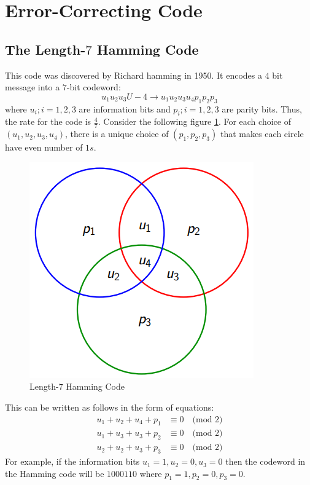 \documentclass[12pt, oneside]{book}
\theoremstyle{definition}
\theoremstyle{definition}
\theoremstyle{remark}
\begin{document}
\section{Error-Correcting Code}
\subsection{The Length-$7$ Hamming Code}
This code was discovered by Richard hamming in 1950. It encodes a $4$ bit message into a $7$-bit codeword:
\[
u_1u_2u_3U-4\rightarrow u_1u_2u_3u_4p_1p_2p_3
\]
where $u_i;i=1,2,3$ are information bits and $p_i;i=1,2,3$ are parity bits. Thus, the rate for the code is $\frac{4}{7}$. Consider the following figure \ref{fig:7bithamcode}. For each choice of $(u_1,u_2,u_3,u_4)$, there is a unique choice of $(p_1,p_2,p_3)$ that makes each circle have even number of $1s$.

\begin{figure}
    \centering
    \includegraphics[width=0.5\linewidth]{Images/7bithamm.png}
    \caption{Length-$7$ Hamming Code}
    \label{fig:7bithamcode}
\end{figure}

This can be written as follows in the form of equations:
\begin{align*}
    u_1+u_2+u_4+p_1 &\equiv 0 \quad \text{(mod 2)}\\
    u_1+u_3+u_3+p_2 &\equiv 0 \quad \text{(mod 2)}\\
    u_2+u_2+u_3+p_3 &\equiv 0 \quad \text{(mod 2)}
\end{align*}
For example, if the information bits $u_1=1,u_2=0,u_3=0$ then the codeword in the Hamming code will be $1000110$ where $p_1=1,p_2=0,p_3=0$.
\end{document}
